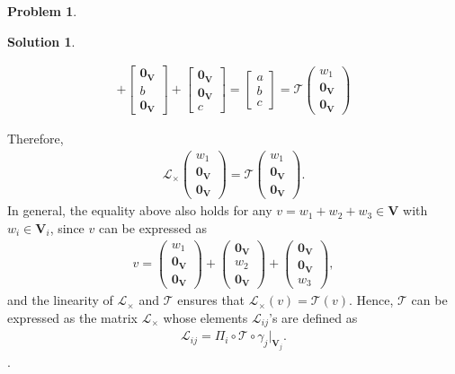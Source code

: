 \documentclass{book}
\theoremstyle{definition}
\newtheorem*{prob*}{Problem}
\newtheorem*{sln*}{Solution}
\newcommand{\V}{\mathbf{V}}
\newcommand{\lag}{\mathcal{L}}
\newcommand{\T}{\mathcal{T}}
\begin{document}
\begin{prob*}
\begin{sln*}
\begin{enumerate}
\begin{enumerate}
\begin{align*}
			 +
			 \begin{bmatrix}
			 \mathbf{0}_\V\\
			 b\\
			 \mathbf{0}_\V
			 \end{bmatrix} 
			 + 
			 \begin{bmatrix}
			 \mathbf{0}_\V\\
			 \mathbf{0}_\V\\
			 c
			 \end{bmatrix} = \begin{bmatrix}
			 a\\b\\c
			 \end{bmatrix} = \T\begin{pmatrix}
			 w_1\\\mathbf{0}_\V\\\mathbf{0}_\V
			 \end{pmatrix}
			\end{align*}

			Therefore,
			\begin{align*}
			\lag_\times\begin{pmatrix}
			w_1\\\mathbf{0}_\V \\ \mathbf{0}_\V
			\end{pmatrix} = \T\begin{pmatrix}
			w_1\\\mathbf{0}_\V \\ \mathbf{0}_\V
			\end{pmatrix}.
			\end{align*}
			In general, the equality above also holds for any $v = w_1 + w_2 + w_3 \in \V$ with $w_i \in \V_i$, since $v$ can be expressed as
			\begin{align*}
			v = \begin{pmatrix}
			w_1\\\mathbf{0}_\V \\ \mathbf{0}_\V
			\end{pmatrix} + \begin{pmatrix}
			\mathbf{0}_\V\\ w_2\\ \mathbf{0}_\V
			\end{pmatrix} + \begin{pmatrix}
			\mathbf{0}_\V\\\mathbf{0}_\V \\ w_3
			\end{pmatrix},
			\end{align*}
			and the linearity of $\lag_\times$ and $\T$ ensures that $\lag_\times(v) = \T(v)$. Hence, $\T$ can be expressed as the matrix $\lag_\times$ whose elements $\lag_{ij}$'s are defined as
			\begin{align*}
			\lag_{ij} = \Pi_i \circ \T \circ \gamma_j\bigg\vert_{\V_j}.
			\end{align*}.


\end{enumerate}
\end{enumerate}
\end{sln*}
\end{prob*}
\end{document}
